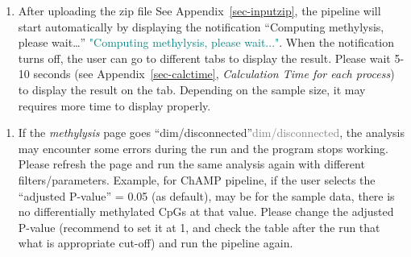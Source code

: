 \documentclass[
  a4paper,
  DIV=11,
  numbers=noendperiod,
  oneside,
  open=any]{scrreport}
\providecommand{\tightlist}{%
  \setlength{\itemsep}{0pt}\setlength{\parskip}{0pt}}\usepackage{longtable,booktabs,array}
\begin{document}
\begin{tcolorbox}[enhanced jigsaw, breakable, colback=white, colbacktitle=quarto-callout-tip-color!10!white, opacityback=0, left=2mm, bottomrule=.15mm, opacitybacktitle=0.6, coltitle=black, bottomtitle=1mm, toprule=.15mm, toptitle=1mm, arc=.35mm, titlerule=0mm, rightrule=.15mm, title=\textcolor{quarto-callout-tip-color}{\faLightbulb}\hspace{0.5em}{Tip}, colframe=quarto-callout-tip-color-frame, leftrule=.75mm]

\begin{enumerate}
\def\labelenumi{\arabic{enumi}.}
\tightlist
\item
  After uploading the zip file See Appendix~\ref{sec-inputzip}, the
  pipeline will start automatically by displaying the notification
  {``Computing methylysis, please wait\ldots{}''}
  \textcolor{teal}{"Computing methylysis, please wait..."}. When the
  notification turns off, the user can go to different tabs to display
  the result. Please wait 5-10 seconds (see Appendix~\ref{sec-calctime},
  \emph{Calculation Time for each process}) to display the result on the
  tab. Depending on the sample size, it may requires more time to
  display properly.
\end{enumerate}

\end{tcolorbox}

\begin{tcolorbox}[enhanced jigsaw, breakable, colback=white, colbacktitle=quarto-callout-tip-color!10!white, opacityback=0, left=2mm, bottomrule=.15mm, opacitybacktitle=0.6, coltitle=black, bottomtitle=1mm, toprule=.15mm, toptitle=1mm, arc=.35mm, titlerule=0mm, rightrule=.15mm, title=\textcolor{quarto-callout-tip-color}{\faLightbulb}\hspace{0.5em}{Tip}, colframe=quarto-callout-tip-color-frame, leftrule=.75mm]

\begin{enumerate}
\def\labelenumi{\arabic{enumi}.}
\setcounter{enumi}{1}
\tightlist
\item
  If the \emph{methylysis} page goes
  {``dim/disconnected''}\textcolor{gray}{dim/disconnected}, the analysis
  may encounter some errors during the run and the program stops
  working. Please refresh the page and run the same analysis again with
  different filters/parameters. Example, for ChAMP pipeline, if the user
  selects the ``adjusted P-value'' = 0.05 (as default), may be for the
  sample data, there is no differentially methylated CpGs at that value.
  Please change the adjusted P-value (recommend to set it at 1, and
  check the table after the run that what is appropriate cut-off) and
  run the pipeline again.
\end{enumerate}

\end{tcolorbox}
\end{document}
